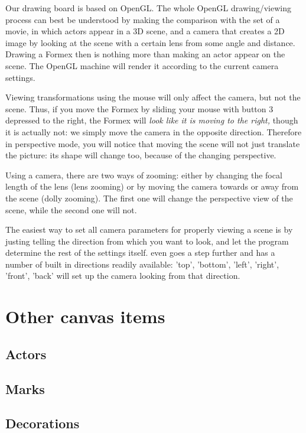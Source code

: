 Our drawing board is based on OpenGL. The whole OpenGL drawing/viewing process can best be understood by making the comparison with the set of a movie, in which actors appear in a 3D scene, and a camera that creates a 2D image by looking at the scene with a certain lens from some angle and distance. Drawing a Formex then is nothing more than making an actor appear on the scene. The OpenGL machine will render it according to the current camera settings. 

Viewing transformations using the mouse will only affect the camera, but not the scene. Thus, if you move the Formex by sliding your mouse with button 3 depressed to the right, the Formex will \emph{look like it is moving to the right,} though it is actually not: we simply move the camera in the opposite direction. Therefore in perspective mode, you will notice that moving the scene will not just translate the picture: its shape will change too, because of the changing perspective.

Using a camera, there are two ways of zooming: either by changing the focal length of the lens (lens zooming) or by moving the camera towards or away from the scene (dolly zooming). The first one will change the perspective view of the scene, while the second one will not. 

The easiest way to set all camera parameters for properly viewing a scene is by justing telling the direction from which you want to look, and let the program determine the rest of the settings itself. \pyformex even goes a step further and has a number of built in directions readily available: 'top', 'bottom', 'left', 'right', 'front', 'back' will set up the camera looking from that direction.

\section{Other canvas items}


\subsection{Actors}

\subsection{Marks}

\subsection{Decorations}
  


